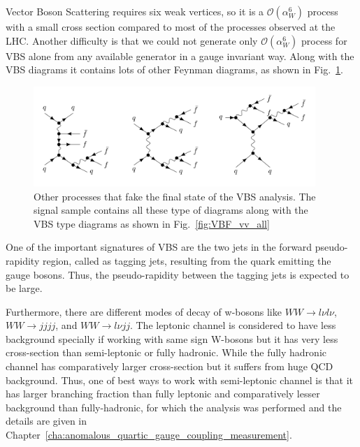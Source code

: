 Vector Boson Scattering requires six weak vertices, so it is a $\mathcal{O}(\alpha^6_W)$ process with a small cross section compared to most of the processes observed at the LHC. Another difficulty is that we could not generate only $\mathcal{O}(\alpha^6_W)$ process for VBS alone from any available generator in a gauge invariant way. Along with the VBS diagrams it contains lots of other Feynman diagrams, as shown in Fig.~\ref{fig:non-vbs}.
\begin{figure}[htbp]
    \centering
    \includegraphics[width=0.95\textwidth]{Pictures/non-vbs.png}
    \caption{Other processes that fake the final state of the VBS analysis. The signal sample contains all these type of diagrams along with the VBS type diagrams as shown in Fig.~\ref{fig:VBF_vv_all}}
    \label{fig:non-vbs}
\end{figure}


One of the important signatures of VBS are the two jets in the forward pseudo-rapidity region, called as tagging jets, resulting from the quark emitting the gauge bosons. Thus, the pseudo-rapidity between the tagging jets is expected to be large.

Furthermore, there are different modes of decay of w-bosons like $WW \rightarrow l \nu l\nu $, $WW \rightarrow jj jj $, and $WW \rightarrow l \nu jj$. The leptonic channel is considered to have less background specially if working with same sign W-bosons but it has very less cross-section than semi-leptonic or fully hadronic. While the fully hadronic channel has comparatively larger cross-section but it suffers from huge QCD background. Thus, one of best ways to work with semi-leptonic channel is that it has larger branching fraction than fully leptonic and comparatively lesser background than fully-hadronic, for which the analysis was performed and the details are given in Chapter~\ref{cha:anomalous_quartic_gauge_coupling_measurement}.
% 

